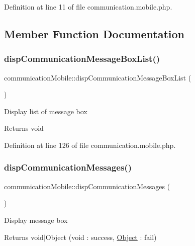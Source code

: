 Definition at line 11 of file communication.\+mobile.\+php.



\subsection{Member Function Documentation}
\mbox{\label{classcommunicationMobile_a0f5fde87f62229177aa693fbc51c99d2}} 
\subsubsection{\texorpdfstring{disp\+Communication\+Message\+Box\+List()}{dispCommunicationMessageBoxList()}}
{\footnotesize\ttfamily communication\+Mobile\+::disp\+Communication\+Message\+Box\+List (\begin{DoxyParamCaption}{ }\end{DoxyParamCaption})}

Display list of message box \begin{DoxyReturn}{Returns}
void 
\end{DoxyReturn}


Definition at line 126 of file communication.\+mobile.\+php.

\mbox{\label{classcommunicationMobile_a1ff627f6e2111856cc297c2291dca2c7}} 
\subsubsection{\texorpdfstring{disp\+Communication\+Messages()}{dispCommunicationMessages()}}
{\footnotesize\ttfamily communication\+Mobile\+::disp\+Communication\+Messages (\begin{DoxyParamCaption}{ }\end{DoxyParamCaption})}

Display message box \begin{DoxyReturn}{Returns}
void$\vert$\+Object (void \+: success, \hyperlink{classObject}{Object} \+: fail) 
\end{DoxyReturn}


